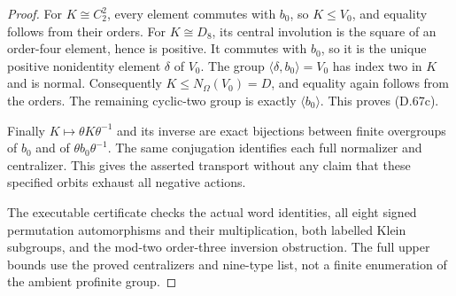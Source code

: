 \begin{proof}
For $K\cong C_2^2$, every element commutes with $b_0$,
so $K\leq V_0$, and equality follows from their orders.
For $K\cong D_8$, its central involution is the square
of an order-four element, hence is positive. It
commutes with $b_0$, so it is the unique positive
nonidentity element $\delta$ of $V_0$.
The group $\langle\delta,b_0\rangle=V_0$ has index two
in $K$ and is normal. Consequently
$K\leq N_\Omega(V_0)=D$, and equality again follows
from the orders. The remaining cyclic-two group is
exactly $\langle b_0\rangle$. This proves (D.67c).

Finally $K\mapsto\theta K\theta^{-1}$ and its inverse
are exact bijections between finite overgroups of $b_0$
and of $\theta b_0\theta^{-1}$. The same conjugation
identifies each full normalizer and centralizer.
This gives the asserted transport without any claim
that these specified orbits exhaust all negative actions.

The executable certificate
checks the actual word identities, all eight signed
permutation automorphisms and their multiplication,
both labelled Klein subgroups, and the mod-two
order-three inversion obstruction. The full upper
bounds use the proved centralizers and nine-type list,
not a finite enumeration of the ambient profinite group.
\end{proof}
